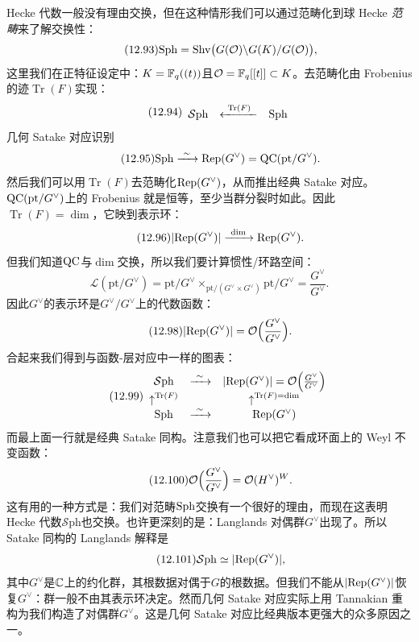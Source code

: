 Hecke 代数一般没有理由交换，但在这种情形我们可以通过范畴化到球 Hecke \emph{范畴}来了解交换性：
\begin{equation}\tag{12.93}
\mathrm{Sph}=\mathrm{Shv}\bigl(G(\mathcal{O})\backslash G(K)/G(\mathcal{O})\bigr),
\end{equation}
这里我们在正特征设定中：$K=\mathbb{F}_{q}((t))$且$\mathcal{O}=\mathbb{F}_{q}[[t]]\subset K$。去范畴化由 Frobenius 的迹$\operatorname{Tr}(F)$实现：
\begin{equation}\tag{12.94}
\begin{array}{ccc}
\mathcal{S}\mathrm{ph} & \xleftarrow{\ \operatorname{Tr}(F)\ } & \mathrm{Sph}
\end{array}
\end{equation}
几何 Satake 对应识别
\begin{equation}\tag{12.95}
\sph\xrightarrow{\ \sim\ }\Rep(G^{\vee})=\QC(\mathrm{pt}/G^{\vee}).
\end{equation}
然后我们可以用$\operatorname{Tr}(F)$去范畴化$\mathrm{Rep}(G^{\vee})$，从而推出经典 Satake 对应。$\mathrm{QC}(\mathrm{pt}/G^{\vee})$上的 Frobenius 就是恒等，至少当群分裂时如此。因此$\operatorname{Tr}(F)=\dim$，它映到表示环：
\begin{equation}\tag{12.96}
|\mathrm{Rep}(G^{\vee})|\xrightarrow{\ \dim\ }\mathrm{Rep}(G^{\vee}).
\end{equation}
但我们知道$\mathrm{QC}$与$\dim$交换，所以我们要计算惯性/环路空间：
\begin{equation}\tag{12.97}
\mathcal{L}(\mathrm{pt}/G^{\vee})=\mathrm{pt}/G^{\vee}\times_{\mathrm{pt}/(G^{\vee}\times G^{\vee})}\mathrm{pt}/G^{\vee}=\frac{G^{\vee}}{G^{\vee}}.
\end{equation}
因此$G^{\vee}$的表示环是$G^{\vee}/G^{\vee}$上的代数函数：
\begin{equation}\tag{12.98}
|\mathrm{Rep}(G^{\vee})|=\mathcal{O}\Bigl(\frac{G^{\vee}}{G^{\vee}}\Bigr).
\end{equation}
合起来我们得到与函数-层对应中一样的图表：
\begin{equation}\tag{12.99}
\begin{array}{ccc}
\mathcal{S}\mathrm{ph} & \xrightarrow{\ \sim\ } & |\mathrm{Rep}(G^{\vee})|=\mathcal{O}\Bigl(\frac{G^{\vee}}{G^{\vee}}\Bigr)\\
{\uparrow}^{\operatorname{Tr}(F)} & & {\uparrow}^{\operatorname{Tr}(F)=\dim}\\
\mathrm{Sph} & \xrightarrow{\ \sim\ } & \mathrm{Rep}(G^{\vee})
\end{array}
\end{equation}
而最上面一行就是经典 Satake 同构。注意我们也可以把它看成环面上的 Weyl 不变函数：
\begin{equation}\tag{12.100}
\mathcal{O}\Bigl(\frac{G^{\vee}}{G^{\vee}}\Bigr)=\mathcal{O}(H^{\vee})^{W}.
\end{equation}
这有用的一种方式是：我们对范畴$\mathrm{Sph}$交换有一个很好的理由，而现在这表明 Hecke 代数$\mathcal{S}\mathrm{ph}$也交换。也许更深刻的是：Langlands 对偶群$G^{\vee}$出现了。所以 Satake 同构的 Langlands 解释是
\begin{equation}\tag{12.101}
\mathcal{S}\mathrm{ph}\simeq|\mathrm{Rep}(G^{\vee})|,
\end{equation}
其中$G^{\vee}$是$\mathbb{C}$上的约化群，其根数据对偶于$G$的根数据。但我们不能从$|\mathrm{Rep}(G^{\vee})|$恢复$G^{\vee}$：群一般不由其表示环决定。然而几何 Satake 对应实际上用 Tannakian 重构为我们构造了对偶群$G^{\vee}$。这是几何 Satake 对应比经典版本更强大的众多原因之一。

